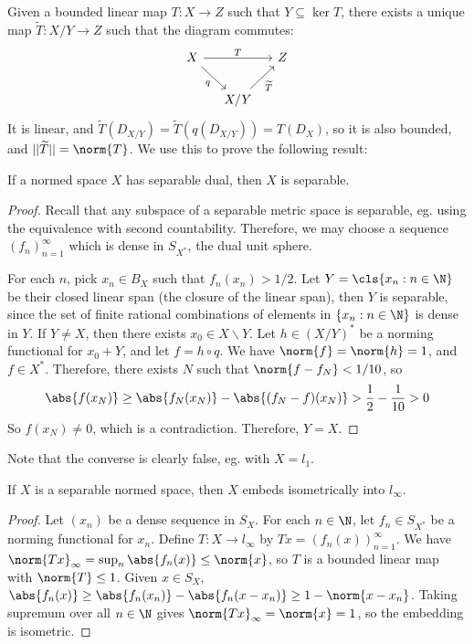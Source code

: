 \documentclass[a4paper]{article}
\begin{document}
Given a bounded linear map $T:X\to Z$ such that $Y\subseteq\ker T$, there exists a unique map $\widetilde{T}:X/Y\to Z$ such that the diagram commutes:
\[
  \begin{tikzcd}[column sep=small]
    X \arrow[rr, "T"] \arrow[dr, "q"'] & & Z\\
    & X/Y \arrow[ur, "\widetilde{T}"'] &
  \end{tikzcd}
\]
It is linear, and $\widetilde{T}(D_{X/Y})=\widetilde{T}(q(D_{X/Y}))=T(D_X)$, so it is also bounded, and $||\widetilde{T}||=\norm{T}$. We use this to prove the following result:

\begin{nthm}\label{thm:DualSeparable}
  If a normed space $X$ has separable dual, then $X$ is separable.
\end{nthm}

\begin{proof}
  Recall that any subspace of a separable metric space is separable, eg. using the equivalence with second countability. Therefore, we may choose a sequence $(f_n)_{n=1}^\infty$ which is dense in $S_{X^*}$, the dual unit sphere.

  For each $n$, pick $x_n\in B_X$ such that $f_n(x_n)>1/2$. Let $Y=\cls\{x_n:n\in\N\}$ be their closed linear span (the closure of the linear span), then $Y$ is separable, since the set of finite rational combinations of elements in $\{x_n:n\in\N\}$ is dense in $Y$. If $Y\not= X$, then there exists $x_0\in X\backslash Y$. Let $h\in(X/Y)^*$ be a norming functional for $x_0+Y$, and let $f=h\circ q$. We have $\norm{f}=\norm{h}=1$, and $f\in X^*$. Therefore, there exists $N$ such that $\norm{f-f_N}<1/10$, so
  \[
    \abs{f(x_N)}\geq\abs{f_N(x_N)}-\abs{(f_N-f)(x_N)}>\frac{1}{2}-\frac{1}{10}>0
  \]
So $f(x_N)\not= 0$, which is a contradiction. Therefore, $Y=X$.
\end{proof}

Note that the converse is clearly false, eg. with $X=l_1$.

\begin{nthm}\label{thm:l_infinity}
  If $X$ is a separable normed space, then $X$ embeds isometrically into $l_\infty$.
\end{nthm}

\begin{proof}
  Let $(x_n)$ be a dense sequence in $S_X$. For each $n\in\N$, let $f_n\in S_{X^*}$ be a norming functional for $x_n$. Define $T:X\to l_\infty$ by $Tx=(f_n(x))_{n=1}^\infty$. We have $\norm{Tx}_\infty=\sup_n\abs{f_n(x)}\leq\norm{x}$, so $T$ is a bounded linear map with $\norm{T}\leq 1$. Given $x\in S_X$, $\abs{f_n(x)}\geq\abs{f_n(x_n)}-\abs{f_n(x-x_n)}\geq 1-\norm{x-x_n}$. Taking supremum over all $n\in\N$ gives $\norm{Tx}_\infty=\norm{x}=1$, so the embedding is isometric.
\end{proof}
\end{document}
